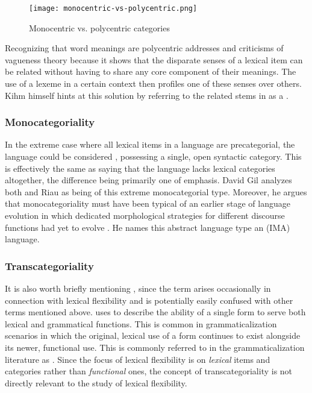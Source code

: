 \begin{figure}[h!]
  \centering
  \texttt{[image: monocentric-vs-polycentric.png]}
  \caption{Monocentric vs. polycentric categories}
  \label{fig:monocentric-vs-polycentric}
\end{figure}

Recognizing that word meanings are polycentric addresses  and  criticisms of vagueness theory because it shows that the disparate senses of a lexical item can be related without having to share any core component of their meanings. The use of a lexeme in a certain context then profiles one of these senses over others. Kihm himself hints at this solution by referring to the related  stems in  as a .

\subsubsection{Monocategoriality}
\label{sec:2.3.1.5}

In the extreme case where all lexical items in a language are precategorial, the language could be considered , possessing a single, open syntactic category. This is effectively the same as saying that the language lacks lexical categories altogether, the difference being primarily one of emphasis. David Gil analyzes both  \parencite*{Gil1995} and Riau  \parencite*{Gil1994} as being of this extreme monocategorial type. Moreover, he argues that monocategoriality must have been typical of an earlier stage of language evolution in which dedicated morphological strategies for different discourse functions had yet to evolve \parencites{Gil2005}{Gil2006}{Gil2012}. He names this abstract language type an  (IMA) language.

\subsubsection{Transcategoriality}
\label{sec:2.3.1.6}

It is also worth briefly mentioning , since the term arises occasionally in connection with lexical flexibility and is potentially easily confused with other terms mentioned above. \textcite{Robert2003} uses  to describe the ability of a single form to serve both lexical and grammatical functions. This is common in grammaticalization scenarios in which the original, lexical use of a form continues to exist alongside its newer, functional use. This is commonly referred to in the grammaticalization literature as  \parencite[118]{HopperTraugott2003}. Since the focus of lexical flexibility is on \emph{lexical} items and categories rather than \emph{functional} ones, the concept of transcategoriality is not directly relevant to the study of lexical flexibility.

